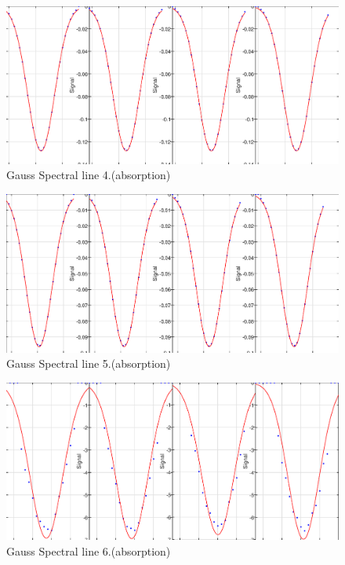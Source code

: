 \documentclass[12pt,oneside,a4paper,english]{article}
\begin{document}
\begin{figure}[H]
    \centering
    \includegraphics[width = 1\textwidth ]{figures/gaus_sl_4.eps}
    \caption{Gauss Spectral line 4.(absorption) }
    \label{fig:Figure 16}
\end{figure}
\begin{figure}[H]
    \centering
    \includegraphics[width = 1\textwidth ]{figures/gaus_sl_5.eps}
    \caption{Gauss Spectral line 5.(absorption) }
    \label{fig:Figure 17}
\end{figure}
\begin{figure}[H]
    \centering
    \includegraphics[width = 1\textwidth ]{figures/gaus_sl_6.eps}
    \caption{Gauss Spectral line 6.(absorption) }
    \label{fig:Figure 18}
\end{figure}
\end{document}
